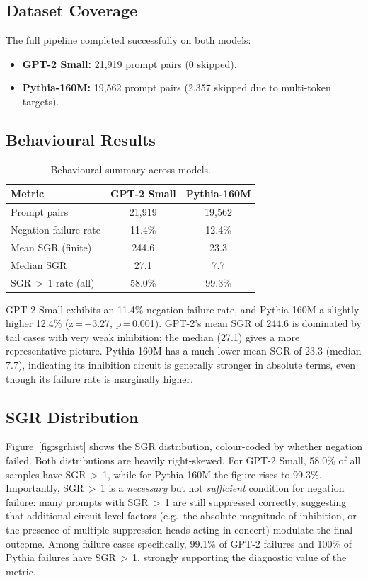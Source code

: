 \documentclass[11pt]{article}
\begin{document}
\subsection{Dataset Coverage}
The full pipeline completed successfully on both models:
\begin{itemize}
\item \textbf{GPT-2 Small:} 21,919 prompt pairs (0 skipped).
\item \textbf{Pythia-160M:} 19,562 prompt pairs (2,357 skipped due to multi-token targets).
\end{itemize}

\subsection{Behavioural Results}

\begin{table}[t]
\centering\small
\begin{tabular}{@{}lcc@{}}
\toprule
\textbf{Metric} & \textbf{GPT-2 Small} & \textbf{Pythia-160M} \\
\midrule
Prompt pairs           & 21,919 & 19,562 \\
Negation failure rate  & 11.4\% & 12.4\% \\
Mean SGR (finite)      & 244.6  & 23.3   \\
Median SGR             & 27.1   & 7.7    \\
SGR\,$>$\,1 rate (all) & 58.0\% & 99.3\% \\
\bottomrule
\end{tabular}
\caption{Behavioural summary across models.}
\label{tab:results}
\end{table}

GPT-2 Small exhibits an 11.4\% negation failure rate, and Pythia-160M a
slightly higher 12.4\% (z\,=\,$-$3.27, p\,=\,0.001).  GPT-2's mean SGR
of 244.6 is dominated by tail cases with very weak inhibition; the median
(27.1) gives a more representative picture.  Pythia-160M has a much lower
mean SGR of 23.3 (median 7.7), indicating its inhibition circuit is
generally stronger in absolute terms, even though its failure rate is
marginally higher.

\subsection{SGR Distribution}
Figure~\ref{fig:sgrhist} shows the SGR distribution, colour-coded by
whether negation failed.  Both distributions are heavily right-skewed.
For GPT-2 Small, 58.0\% of all samples have SGR\,$>$\,1, while for
Pythia-160M the figure rises to 99.3\%.  Importantly, SGR\,$>$\,1 is a
\emph{necessary} but not \emph{sufficient} condition for negation failure:
many prompts with SGR\,$>$\,1 are still suppressed correctly, suggesting
that additional circuit-level factors (e.g.\ the absolute magnitude of
inhibition, or the presence of multiple suppression heads acting in
concert) modulate the final outcome.  Among failure cases specifically,
99.1\% of GPT-2 failures and 100\% of Pythia failures have SGR\,$>$\,1,
strongly supporting the diagnostic value of the metric.
\end{document}

